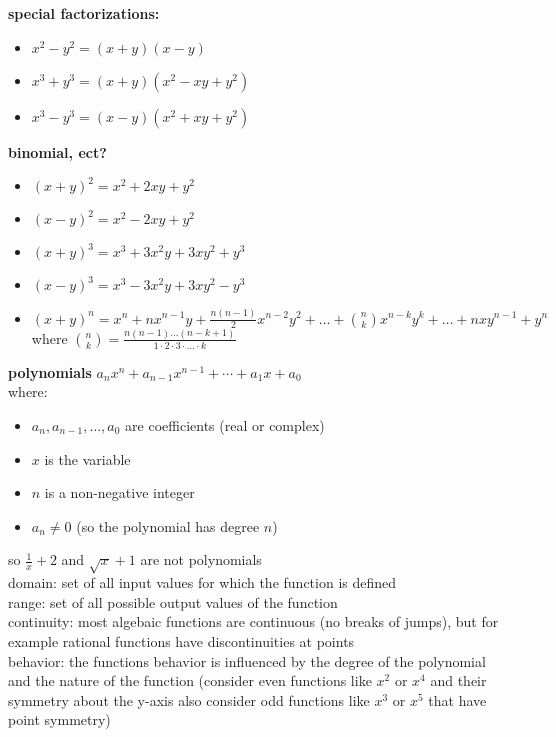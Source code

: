 \documentclass{article}
\begin{document}
\textbf{special factorizations:}
	\begin{itemize}
		\item $x^2 - y^2 = (x + y)(x - y)$
		\item $x^3 + y^3 = (x + y)(x^2 - xy + y^2)$
		\item $x^3 - y^3 = (x - y)(x^2 + xy + y^2)$
	\end{itemize}

\textbf{binomial, ect?}
	\begin{itemize}
		\item $(x + y)^2 = x^2 + 2xy + y^2$
		\item $(x - y)^2 = x^2 - 2xy + y^2$
		\item $(x + y)^3 = x^3 + 3x^2y + 3xy^2 + y^3$
		\item $(x - y)^3 = x^3 - 3x^2y + 3xy^2 - y^3$
		\item $(x + y)^n = x^n + nx^{n-1}y + \frac{n(n-1)}{2}x^{n-2}y^2 + \ldots + \binom{n}{k}x^{n-k}y^k + \dots + nxy^{n-1} + y^n$
			where $\binom{n}{k} = \frac{n(n-1) \dots (n-k+1)}{1 \cdot 2 \cdot 3 \cdot \ldots \cdot k}$
	\end{itemize}

\textbf{polynomials}
$a_nx^n + a_{n-1}x^{n-1} + \cdots + a_1x + a_0$\\
where:
	\begin{itemize}
		\item $a_n, a_{n-1}, \ldots, a_0$ are coefficients (real or complex)
		\item $x$ is the variable
		\item $n$ is a non-negative integer
		\item $a_n \neq 0$ (so the polynomial has degree $n$)
	\end{itemize}

so $\frac{1}{x} + 2$ and $\sqrt{x} + 1$ are not polynomials\\

domain: set of all input values for which the function is defined\\

range: set of all possible output values of the function\\

continuity: most algebaic functions are continuous (no breaks of jumps), but for example rational functions have discontinuities at points\\

behavior: the functions behavior is influenced by the degree of the polynomial and the nature of the function (consider even functions like $x^2$ or $x^4$ and their symmetry about the y-axis also consider odd functions like $x^3$ or $x^5$ that have point symmetry)\\
\end{document}

